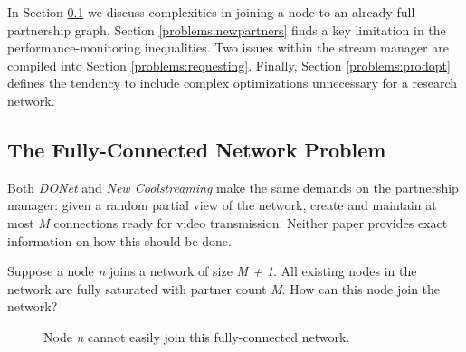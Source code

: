 \documentclass[12pt,a4paper]{article}
\begin{document}
In Section \ref{problems:fcn} we discuss complexities in joining a node to an already-full partnership graph. Section \ref{problems:newpartners} finds a key limitation in the performance-monitoring inequalities. Two issues within the stream manager are compiled into Section \ref{problems:requesting}. Finally, Section \ref{problems:prodopt} defines the tendency to include complex optimizations unnecessary for a research network.

\subsection{The Fully-Connected Network Problem} \label{problems:fcn}
Both \textit{DONet} and \textit{New Coolstreaming} make the same demands on the partnership manager: given a random partial view of the network, create and maintain at most \textit{M} connections ready for video transmission. Neither paper provides exact information on how this should be done.

Suppose a node \textit{n} joins a network of size \textit{M + 1}. All existing nodes in the network are fully saturated with partner count \textit{M}. How can this node join the network?

\begin{figure}[!ht]
	\centering
	\caption{Node \textit{n} cannot easily join this fully-connected network.}
	\label{fig1}
\end{figure}
\end{document}
